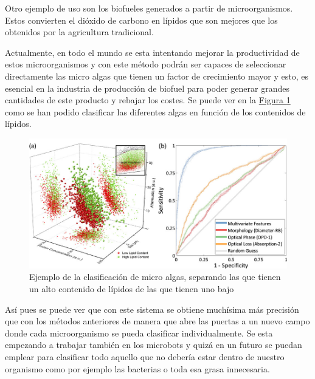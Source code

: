 \documentclass[a4paper, 12pt, UTF8]{article}
\begin{document}
Otro ejemplo de uso son los biofueles generados a partir de microorganismos. Estos convierten el dióxido de carbono en lípidos que son mejores que los obtenidos por la agricultura tradicional. 

Actualmente, en todo el mundo se esta intentando mejorar la productividad de estos microorganismos y con este método podrán ser capaces de seleccionar directamente las micro algas que tienen un factor de crecimiento mayor y esto, es esencial en la industria de producción de biofuel para poder generar grandes cantidades de este producto y rebajar los costes. Se puede ver en la \hyperref[fig:impacto_2]{Figura \ref{fig:impacto_2}} como se han podido clasificar las diferentes algas en función de los contenidos de lípidos.

\begin{figure}[H]
	\centering
	\includegraphics[width=\linewidth]{impacto_2}
	\caption{Ejemplo de la clasificación de micro algas, separando las que tienen un alto contenido de lípidos de las que tienen uno bajo}
	\label{fig:impacto_2}
\end{figure}

Así pues se puede ver que con este sistema se obtiene muchísima más precisión que con los métodos anteriores de manera que abre las puertas a un nuevo campo donde cada microorganismo se pueda clasificar individualmente. Se esta empezando a trabajar también en los microbots \cite{microbots} y quizá en un futuro se puedan emplear para clasificar todo aquello que no debería estar dentro de nuestro organismo como por ejemplo las bacterias o toda esa grasa innecesaria. 

\printbibliography
\end{document}
